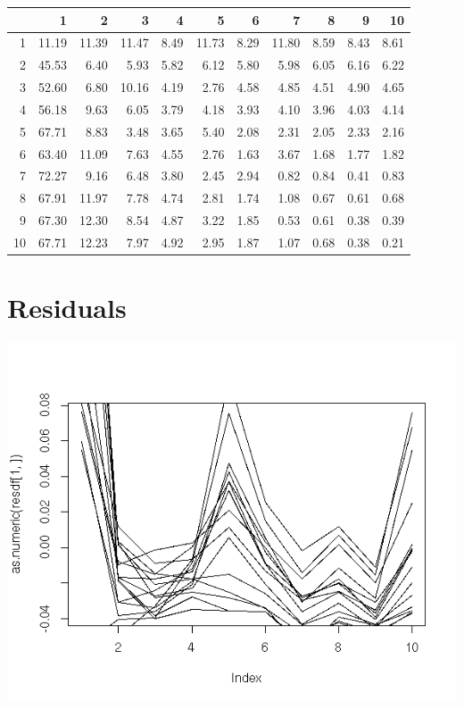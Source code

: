 \documentclass{amsart}
\begin{document}
\begin{table}[ht]
\centering
\begin{tabular}{rrrrrrrrrrr}
  \hline
 & 1 & 2 & 3 & 4 & 5 & 6 & 7 & 8 & 9 & 10 \\ 
  \hline
1 & 11.19 & 11.39 & 11.47 & 8.49 & 11.73 & 8.29 & 11.80 & 8.59 & 8.43 & 8.61 \\ 
  2 & 45.53 & 6.40 & 5.93 & 5.82 & 6.12 & 5.80 & 5.98 & 6.05 & 6.16 & 6.22 \\ 
  3 & 52.60 & 6.80 & 10.16 & 4.19 & 2.76 & 4.58 & 4.85 & 4.51 & 4.90 & 4.65 \\ 
  4 & 56.18 & 9.63 & 6.05 & 3.79 & 4.18 & 3.93 & 4.10 & 3.96 & 4.03 & 4.14 \\ 
  5 & 67.71 & 8.83 & 3.48 & 3.65 & 5.40 & 2.08 & 2.31 & 2.05 & 2.33 & 2.16 \\ 
  6 & 63.40 & 11.09 & 7.63 & 4.55 & 2.76 & 1.63 & 3.67 & 1.68 & 1.77 & 1.82 \\ 
  7 & 72.27 & 9.16 & 6.48 & 3.80 & 2.45 & 2.94 & 0.82 & 0.84 & 0.41 & 0.83 \\ 
  8 & 67.91 & 11.97 & 7.78 & 4.74 & 2.81 & 1.74 & 1.08 & 0.67 & 0.61 & 0.68 \\ 
  9 & 67.30 & 12.30 & 8.54 & 4.87 & 3.22 & 1.85 & 0.53 & 0.61 & 0.38 & 0.39 \\ 
  10 & 67.71 & 12.23 & 7.97 & 4.92 & 2.95 & 1.87 & 1.07 & 0.68 & 0.38 & 0.21 \\ 
   \hline
\end{tabular}
\end{table}

\section{Residuals}

\includegraphics[scale=0.8]{markovmoralserr.jpeg}
\end{document}
